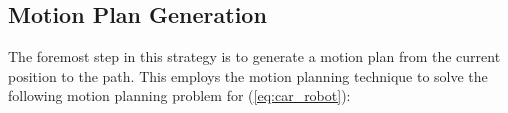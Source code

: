 \subsection{Motion Plan Generation}
\label{sec:trajectory_generation}
The foremost step in this strategy is to generate a motion plan from the current position to the path. This employs the motion planning technique to solve the following motion planning problem for (\ref{eq:car_robot}): 
